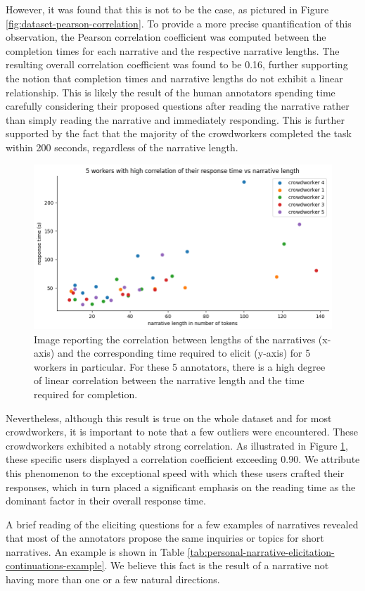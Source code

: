However, it was found that this is not to be the case, as pictured in Figure \ref{fig:dataset-pearson-correlation}. To provide a more precise quantification of this observation, the Pearson correlation coefficient \cite{pearson} was computed between the completion times for each narrative and the respective narrative lengths. The resulting overall correlation coefficient was found to be 0.16, further supporting the notion that completion times and narrative lengths do not exhibit a linear relationship. This is likely the result of the human annotators spending time carefully considering their proposed questions after reading the narrative rather than simply reading the narrative and immediately responding. This is further supported by the fact that the majority of the crowdworkers completed the task within 200 seconds, regardless of the narrative length.

\begin{figure}[!htbp]
        \includegraphics[width=1\linewidth]{assets//imgs/dataset-high-correlation-workers.png}
        \caption{Image reporting the correlation between lengths of the narratives (x-axis) and the corresponding time required to elicit (y-axis) for 5 workers in particular. For these 5 annotators, there is a high degree of linear correlation between the narrative length and the time required for completion.}
        \label{fig:dataset-high-correlation-workers}
\end{figure}
Nevertheless, although this result is true on the whole dataset and for most crowdworkers, it is important to note that a few outliers were encountered. These crowdworkers exhibited a notably strong correlation. As illustrated in Figure \ref{fig:dataset-high-correlation-workers}, these specific users displayed a correlation coefficient exceeding 0.90. We attribute this phenomenon to the exceptional speed with which these users crafted their responses, which in turn placed a significant emphasis on the reading time as the dominant factor in their overall response time.


A brief reading of the eliciting questions for a few examples of narratives revealed that most of the annotators propose the same inquiries or topics for short narratives. An example is shown in Table \ref{tab:personal-narrative-elicitation-continuations-example}. We believe this fact is the result of a narrative not having more than one or a few natural directions.%
